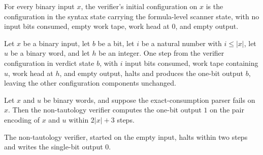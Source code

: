 \begin{lemma}
\label{Complexity.taut_init}
\leanok
{}
For every binary input $x$, the verifier's initial configuration on $x$ is the
configuration in the syntax state carrying the formula-level scanner state, with no
input bits consumed, empty work tape, work head at $0$, and empty output.
\end{lemma}

\begin{lemma}
\label{Complexity.taut_verdict}
\leanok
{}
Let $x$ be a binary input, let $b$ be a bit, let $i$ be a natural number with $i\le
|x|$, let $u$ be a binary word, and let $h$ be an integer. One step from the verifier
configuration in verdict state $b$, with $i$ input bits consumed, work tape containing
$u$, work head at $h$, and empty output, halts and produces the one-bit output $b$,
leaving the other configuration components unchanged.
\end{lemma}

\begin{lemma}
\label{Complexity.taut_machine_malformed}
\leanok
{}
Let $x$ and $u$ be binary words, and suppose the exact-consumption parser fails on $x$.
Then the non-tautology verifier computes the one-bit output $1$ on the pair encoding of
$x$ and $u$ within $2|x|+3$ steps.
\end{lemma}

\begin{lemma}
\label{Complexity.taut_machine_empty}
\leanok
{}
The non-tautology verifier, started on the empty input, halts within two steps and
writes the single-bit output $0$.
\end{lemma}

